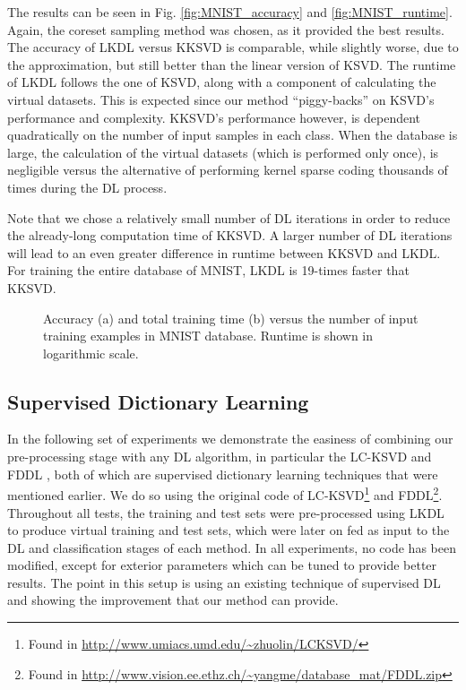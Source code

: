 \documentclass[journal]{IEEEtran}
\begin{document}
The results can be seen in Fig. \ref{fig:MNIST_accuracy} and \ref{fig:MNIST_runtime}. Again, the coreset sampling method was chosen, as it provided the best results. The accuracy of LKDL versus KKSVD is comparable, while slightly worse, due to the approximation, but still better than the linear version of KSVD. The runtime of LKDL follows the one of KSVD, along with a component of calculating the virtual datasets. This is expected since our method ``piggy-backs'' on KSVD's performance and complexity. KKSVD's performance however, is dependent quadratically on the number of input samples in each class. When the database is large, the calculation of the virtual datasets (which is performed only once), is negligible versus the alternative of performing kernel sparse coding thousands of times during the DL process.

Note that we chose a relatively small number of DL iterations in order to reduce the already-long computation time of KKSVD. A larger number of DL iterations will lead to an even greater difference in runtime between KKSVD and LKDL.
For training the entire database of MNIST, LKDL is 19-times faster that KKSVD.


\begin{figure*}[!t]
\centering
{}
\hfil
{}
\caption{Accuracy (a) and total training time (b) versus the number of input training examples in MNIST database. Runtime is shown in logarithmic scale.}
\label{fig:GRAPH_3}
\end{figure*}

\subsection{Supervised Dictionary Learning}\label{SS:Supervised}

In the following set of experiments we demonstrate the easiness of combining our pre-processing stage with any DL algorithm, in particular the LC-KSVD \cite{LCKSVD} and FDDL \cite{FDDL}, both of which are supervised dictionary learning techniques that were mentioned earlier. We do so using the original code of LC-KSVD\footnote{Found in \url{http://www.umiacs.umd.edu/~zhuolin/LCKSVD/}} and FDDL\footnote{Found in \url{http://www.vision.ee.ethz.ch/~yangme/database_mat/FDDL.zip}}.
Throughout all tests, the training and test sets were pre-processed using LKDL to produce virtual training and test sets, which were later on fed as input to the DL and classification stages of each method. In all experiments, no code has been modified, except for exterior parameters which can be tuned to provide better results. The point in this setup is using an existing technique of supervised DL and showing the improvement that our method can provide.
\end{document}
